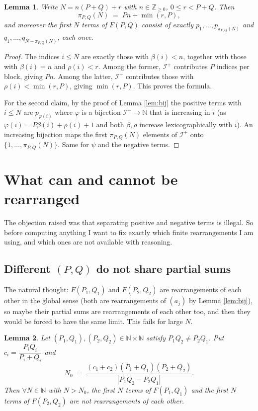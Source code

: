 \documentclass[11pt]{article}
\newtheorem{lemma}{Lemma}
\begin{document}
\begin{lemma}\label{lem:pi}
Write $N = n(P+Q) + r$ with $n \in \mathbb{Z}_{\ge 0}$, $0 \le r < P+Q$. Then
\[
\pi_{P,Q}(N) \;=\; Pn + \min(r, P),
\]
and moreover the first $N$ terms of $F(P,Q)$ consist of exactly
$p_1, \dots, p_{\pi_{P,Q}(N)}$ and $q_1, \dots, q_{N - \pi_{P,Q}(N)}$, each once.
\end{lemma}

\begin{proof}
The indices $i \le N$ are exactly those with $\beta(i) < n$, together with those with
$\beta(i) = n$ and $\rho(i) < r$. Among the former, $\mathcal{I}^{+}$ contributes $P$
indices per block, giving $Pn$. Among the latter, $\mathcal{I}^{+}$ contributes those
with $\rho(i) < \min(r,P)$, giving $\min(r,P)$. This proves the formula.

For the second claim, by the proof of Lemma \ref{lem:bij} the positive terms with
$i \le N$ are $p_{\varphi(i)}$ where $\varphi$ is a bijection $\mathcal{I}^{+} \to \mathbb{N}$
that is increasing in $i$ (as $\varphi(i) = P\beta(i) + \rho(i) + 1$ and both $\beta,\rho$
increase lexicographically with $i$). An increasing bijection maps the first
$\pi_{P,Q}(N)$ elements of $\mathcal{I}^{+}$ onto $\{1, \dots, \pi_{P,Q}(N)\}$. Same for
$\psi$ and the negative terms.
\end{proof}

\section{What can and cannot be rearranged}

The objection raised was that separating positive and negative terms is illegal. So
before computing anything I want to fix exactly which finite rearrangements I am using,
and which ones are not available with reasoning.

\subsection*{Different $(P,Q)$ do not share partial sums}

The natural thought: $F(P_1,Q_1)$ and $F(P_2,Q_2)$ are rearrangements of each other in
the global sense (both are rearrangements of $(a_j)$ by Lemma \ref{lem:bij}), so maybe
their partial sums are rearrangements of each other too, and then they would be forced to
have the same limit. This fails for large $N$.

\begin{lemma}\label{lem:notrearr}
Let $(P_1,Q_1), (P_2,Q_2) \in \mathbb{N} \times \mathbb{N}$ satisfy
$P_1 Q_2 \neq P_2 Q_1$. Put $c_i = \dfrac{P_i Q_i}{P_i + Q_i}$ and
\[
N_0 \;=\; \frac{(c_1 + c_2)(P_1+Q_1)(P_2+Q_2)}{\left| P_1 Q_2 - P_2 Q_1 \right|} .
\]
Then $\forall N \in \mathbb{N}$ with $N > N_0$, the first $N$ terms of $F(P_1,Q_1)$ and
the first $N$ terms of $F(P_2,Q_2)$ are not rearrangements of each other.
\end{lemma}
\end{document}
